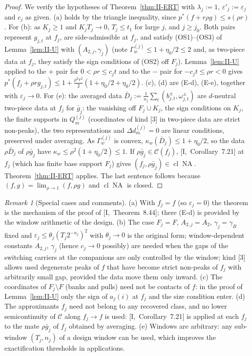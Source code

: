 \documentclass[10pt]{amsart}
\theoremstyle{definition}
\theoremstyle{remark}
\newtheorem{remark}[theorem]{Remark}
\newcommand{\NA}{\operatorname{NA}}
\newcommand{\Cset}{\mathcal C}
\newcommand{\cl}{\operatorname{cl}}
\begin{document}
\begin{proof}
We verify the hypotheses of Theorem~\ref{thm:II-ERT} with $\lambda_j:=1$,
$\varepsilon'_j:=\varepsilon_j$ and $c_j$ as given.  (a) holds by the
triangle inequality, since $p^*(f+r\rho g)\le s(\rho r)$.  For (b): as
$K_j\ge1$ and $K_jT_j\to0$, $T_j\le t_1$ for large $j$, and $j\ge j_0$.  Both
pairs represent $g_{j,t}$ at $f_j$, are side-admissible at $f_j$, and
satisfy (OS1)--(OS3) of Lemma~\ref{lem:II-U} with $(A_{2,j},\gamma_j)$ (note
$\Gamma^{(j)}_w\le1+\eta_0/2\le2$ and, as two-piece data at $f_j$, they
satisfy the sign conditions of (OS2) off $F_j$).  Lemma~\ref{lem:II-U} applied
to the $+$ pair for $0<\rho r\le c_jt$ and to the $-$ pair for $-c_jt\le\rho
r<0$ gives $p^*(f_j+\rho rg_{j,t})\le1+\frac{\rho^2r^2}2(1+\eta_0/2+\eta_0/2)$.
(c), (d) are (E-d), (E-e), together with $\varepsilon_j\to0$.  For (e): the
averaged data $\bar D_j:=\frac1{n_j}\sum_t(b^\pm_{j,t},\omega^\pm_{j,t})$ are
$d$-neutral two-piece data at $f_j$ for $\bar g_j$: the vanishing off
$F_j\cup K_j$, the sign conditions on $K_j$, the finite supports in
$Q^{(j)}_m$ (coordinates of kind [3] in two-piece data are strict
non-peaks), the two representations and $\Delta d^{(j)}_m=0$ are linear
conditions, preserved under averaging.  As $\Gamma^{(j)}_w$ is convex,
$\kappa_w(\bar D_j)\le1+\eta_0/2$, so the data $\rho\bar D_j$ of $\rho\bar g_j$
have $\kappa_w\le\rho^2(1+\eta_0/2)\le1$.  If $\rho\bar g_j\in\Cset(f_j)$,
[I,~Corollary~7.21] at $f_j$ (which has finite base support $F_j$) gives
$(f_j,\rho\bar g_j)\in\cl\NA$.  Theorem~\ref{thm:II-ERT} applies.  The last
sentence follows because $(f,g)=\lim_{\rho\to1}(f,\rho g)$ and $\cl\NA$ is
closed.
\end{proof}

\begin{remark}[Special cases and comments]\label{rem:II-E}
(a) With $f_j=f$ (so $\varepsilon_j=0$) the theorem is the mechanism of the
proof of [I,~Theorem~8.44]; there (E-d) is provided by the window
arithmetic of the design.
(b) The case $F_j=F$, $A_{2,j}=A_2$, $\gamma_j=\gamma_B$ fixed and
$\varepsilon_j\le\theta_j(T_j2^{-n_j})^2$ with $\theta_j\to0$ is the original
form; window-dependent constants $A_{2,j}$, $\gamma_j$ (hence $c_j\to0$
possibly) are needed when the gaps of the switching carriers at the
companions are only controlled by the window; kind [3] allows used
degenerate peaks of $f$ that have become strict non-peaks of $f_j$ with
arbitrarily small gap, provided the data move them only inward.
(c) The coordinates of $F_j\setminus F$ (banks and pulls) need not be
contacts of $f$: in the proof of Lemma~\ref{lem:II-U} only the sign of
$a_j(i)$ at $f_j$ and the size condition enter.
(d) The approximants $f_j$ need not belong to any recovered class, and no
lower semicontinuity of $\Cset$ along $f_j\to f$ is used:
[I,~Corollary~7.21] is applied at each $f_j$ to the mate $\rho\bar g_j$ of
$f_j$ obtained by averaging.
(e) Windows are arbitrary: any sub-window $(T_j,n_j)$ of a design window can
be used, which improves the exactification thresholds in applications.
\end{remark}
\end{document}
